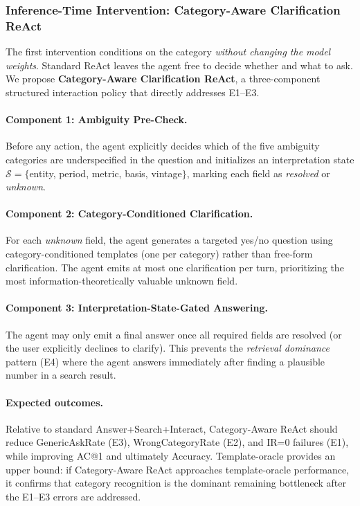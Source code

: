 \subsubsection{Inference-Time Intervention: Category-Aware Clarification ReAct}
\label{sec:axisreact}

The first intervention conditions on the category \emph{without changing the model
weights}. Standard ReAct leaves the agent free to decide whether and what to ask.
We propose \textbf{Category-Aware Clarification ReAct}, a three-component
structured interaction policy that directly addresses E1--E3.

\paragraph{Component 1: Ambiguity Pre-Check.}
Before any action, the agent explicitly decides which of the five ambiguity
categories are underspecified in the question and initializes an interpretation
state $\mathcal{S} = \{$entity, period, metric, basis, vintage$\}$, marking
each field as \emph{resolved} or \emph{unknown}.

\paragraph{Component 2: Category-Conditioned Clarification.}
For each \emph{unknown} field, the agent generates a targeted yes/no question
using category-conditioned templates (one per category) rather than free-form
clarification.
The agent emits at most one clarification per turn, prioritizing the most
information-theoretically valuable unknown field.

\paragraph{Component 3: Interpretation-State-Gated Answering.}
The agent may only emit a final answer once all required fields are resolved
(or the user explicitly declines to clarify).
This prevents the \emph{retrieval dominance} pattern (E4) where the agent
answers immediately after finding a plausible number in a search result.

\paragraph{Expected outcomes.}
Relative to standard Answer+Search+Interact, Category-Aware ReAct should reduce
GenericAskRate (E3), WrongCategoryRate (E2), and IR=0 failures (E1), while
improving AC@1 and ultimately Accuracy.
Template-oracle provides an upper bound: if Category-Aware ReAct approaches
template-oracle performance, it confirms that category recognition is the dominant
remaining bottleneck after the E1--E3 errors are addressed.

